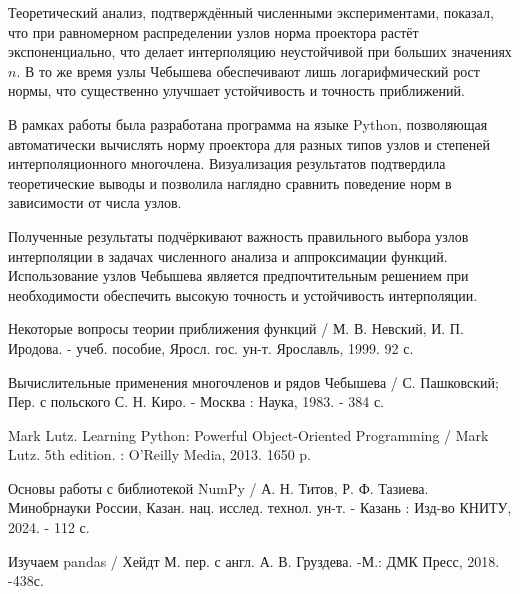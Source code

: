 \documentclass[14pt,openany,a4paper,oneside]{extarticle}
\begin{document}
	Теоретический анализ, подтверждённый численными экспериментами, показал, что при равномерном распределении узлов норма проектора растёт экспоненциально, что делает интерполяцию неустойчивой при больших значениях $n$. В то же время узлы Чебышева обеспечивают лишь логарифмический рост нормы, что существенно улучшает устойчивость и точность приближений.
	
	В рамках работы была разработана программа на языке Python, позволяющая автоматически вычислять норму проектора для разных типов узлов и степеней интерполяционного многочлена. Визуализация результатов подтвердила теоретические выводы и позволила наглядно сравнить поведение норм в зависимости от числа узлов.
	
	Полученные результаты подчёркивают важность правильного выбора узлов интерполяции в задачах численного анализа и аппроксимации функций. Использование узлов Чебышева является предпочтительным решением при необходимости обеспечить высокую точность и устойчивость интерполяции.
	\newpage
	
	\begin{thebibliography}{2}
		
		Некоторые вопросы теории приближения функций / М. В. Невский, И. П. Иродова. - учеб. пособие, Яросл. гос. ун-т. Ярославль, 1999. 92 с.
		
		Вычислительные применения многочленов и рядов Чебышева / С. Пашковский; Пер. с польского С. Н. Киро. - Москва : Наука, 1983. - 384 с.
		
		Mark Lutz. Learning Python: Powerful Object-Oriented Programming / Mark Lutz. 5th edition. : O'Reilly Media, 2013. 1650 p.
		
		Основы работы с библиотекой NumPy / А. Н. Титов, Р. Ф. Тазиева. Минобрнауки России, Казан. нац. исслед. технол. ун-т. - Казань : Изд-во КНИТУ, 2024. - 112 с.
		
		Изучаем pandas / Хейдт М. пер. с англ. А. В. Груздева. -М.: ДМК Пресс, 2018. -438с.
		
	\end{thebibliography}
	\newpage
	
\end{document}
